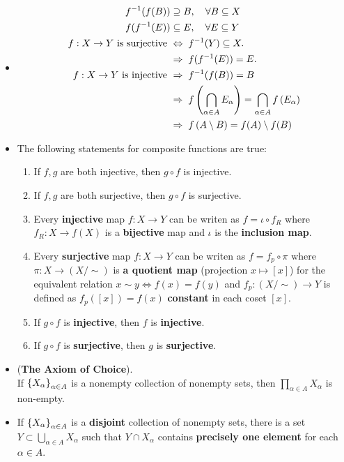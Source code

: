 \documentclass[11pt]{article}
\begin{document}
\begin{itemize}
\item \begin{remark}
\begin{align*}
f^{-1}(f(B)) &\supseteq  B,\quad \forall B \subseteq X \\
f(f^{-1}(E)) &\subseteq E,\quad \forall E \subseteq Y \\
f: X\rightarrow Y \text{ is surjective }&\Leftrightarrow \; f^{-1}(Y) \subseteq X. \\
&\Rightarrow  \; f(f^{-1}(E)) = E. \\
f: X\rightarrow Y \text{ is injective }& \Rightarrow\; f^{-1}(f(B)) = B \\
& \Rightarrow\; f\left(\bigcap_{\alpha \in A}E_{\alpha}\right) = \bigcap_{\alpha \in A}f\left(E_{\alpha}\right) \\
& \Rightarrow\; f\left(A \setminus B\right) = f(A) \setminus f(B)
\end{align*}
\end{remark}

\item \begin{proposition}
The following statements for composite functions are true:
\begin{enumerate}
\item If $f, g$ are both injective, then $g \circ f$ is injective. 
\item If $f, g$ are both surjective, then $g \circ f$ is surjective. 
\item Every \textbf{injective} map $f: X \rightarrow Y$ can be writen as $f = \iota \circ f_{R}$ where $f_R: X \rightarrow f(X)$ is a \textbf{bijective} map and $\iota$ is the \textbf{inclusion map}.
\item Every \textbf{surjective} map $f: X \rightarrow Y$ can be writen as $f =  f_{p} \circ \pi$ where $\pi: X\rightarrow (X/\sim)$ is \textbf{a quotient map} (projection $x \mapsto [x]$) for the equivalent relation $ x \sim y \Leftrightarrow f(x) = f(y)$ and  $f_p: (X/\sim) \rightarrow Y$ is defined as $f_p([x]) = f(x)$ \textbf{constant} in each coset $[x]$.
\item If $g \circ f$ is \textbf{injective}, then $f$ is \textbf{injective}.
\item If $g \circ f$ is \textbf{surjective}, then $g$ is \textbf{surjective}.
\end{enumerate}
\end{proposition}

\item \begin{principle} (\textbf{The Axiom of Choice}).\\
If $\left\{X_{\alpha}\right\}_{\alpha \in A}$ is a nonempty collection of nonempty sets, then $\prod_{\alpha \in A}X_{\alpha}$ is non-empty.
\end{principle}

\item \begin{corollary}
If $\left\{X_{\alpha}\right\}_{\alpha \in A}$ is a \textbf{disjoint} collection of nonempty sets, there is a set $Y \subset \bigcup_{\alpha \in A}X_{\alpha}$ such that $Y \cap X_{\alpha}$ contains \textbf{precisely one element} for each $\alpha \in A$.
\end{corollary}
\end{itemize}
\end{document}
